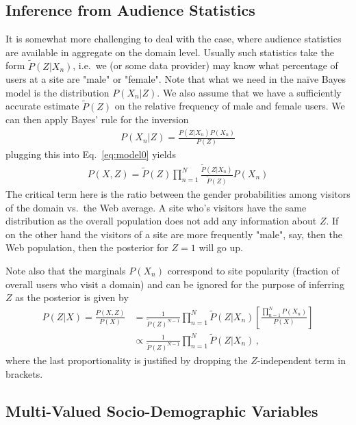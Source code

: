 \documentclass{article}
\begin{document}
\subsection{Inference from Audience Statistics}

It is somewhat more challenging to deal with the case, where audience statistics are available in aggregate on the domain level. Usually such statistics take the form  $\tilde P(Z | X_n)$, i.e.~we (or some data provider) may know what percentage of users at a site are "male" or "female".  Note that what we need in the na\"ive Bayes model is the distribution $P(X_n|Z)$. We also assume that we have a sufficiently accurate estimate $\tilde P(Z)$ on the relative frequency of male and female users. We can then apply Bayes' rule for the inversion 
\begin{align}
P(X_n|Z) = \frac{P(Z|X_n) P(X_n)}{P(Z)}
\end{align}
plugging this into Eq.~\eqref{eq:model0} yields
\begin{align}
P(X,Z) = \tilde P(Z)  \prod_{n=1}^N \frac{\tilde P(Z|X_n)}{\tilde P(Z)} P(X_n) 
\end{align}
The critical term here is the ratio between the gender probabilities among visitors of the domain vs.~the Web average. A site who's visitors have the same distribution as the overall population does not add any information about $Z$.  If on the other hand the visitors of a site are more frequently "male", say,  then the Web population, then the posterior for $Z=1$ will go up. 

Note also that the marginals $P(X_n)$ correspond to site popularity (fraction of overall users who visit a domain) and  can be ignored for the purpose of inferring $Z$ as the posterior is given by 
\begin{align}
P(Z|X) = \frac{P(X,Z)}{P(X)} 
& = \frac{1}{\tilde P(Z)^{N-1}}  \prod_{n=1}^N \tilde P(Z|X_n) \left[ \frac{\prod_{n=1}^N P(X_n)}{P(X)} \right] 
\nonumber \\ 
& 
\propto  \frac{1}{\tilde P(Z)^{N-1}}  \prod_{n=1}^N \tilde P(Z|X_n) \,,
\label{eq:posterior-binomial}
\end{align}
where the last proportionality is justified by dropping the $Z$-independent term in brackets. 

\subsection{Multi-Valued Socio-Demographic Variables} 
\end{document}
